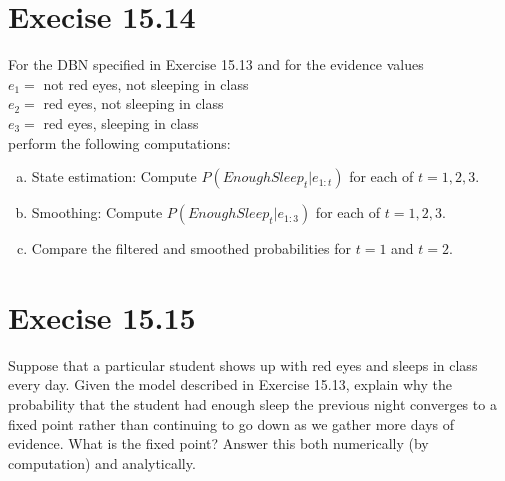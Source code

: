 \documentclass{article}
\begin{document}
\section{Execise 15.14}
For the DBN specified in Exercise 15.13 and for the evidence values \\
$e_1 =$ not red eyes, not sleeping in class \\
$e_2 =$ red eyes, not sleeping in class \\
$e_3 =$ red eyes, sleeping in class \\
perform the following computations:
\begin{enumerate}[a.]
\item State estimation: Compute $P(EnoughSleep_t|e_{1:t})$ for each
  of $t = 1, 2, 3$.
\item Smoothing: Compute $P(EnoughSleep_t|e_{1:3})$ for each of $t = 1,2,3$.
\item Compare the filtered and smoothed probabilities for $t = 1$ and $t = 2$.
\end{enumerate}

\section{Execise 15.15}
Suppose that a particular student shows up with red eyes and sleeps in
class every day. Given the model described in Exercise 15.13, explain
why the probability that the student had enough sleep the previous
night converges to a fixed point rather than continuing to go down as
we gather more days of evidence. What is the fixed point? Answer this
both numerically (by computation) and analytically.
\end{document}
